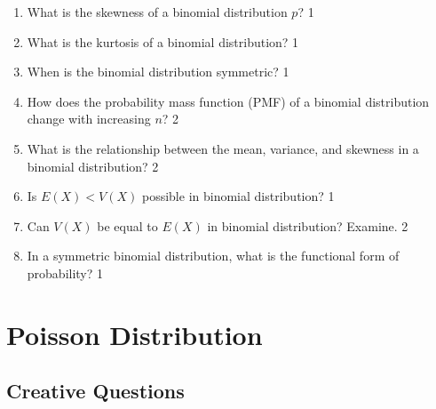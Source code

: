 \documentclass[a4paper,oneside, margin=1.4in]{book}
\begin{document}
\begin{enumerate}
\item What is the skewness of a binomial distribution \( p \)? \hfill 1

\item What is the kurtosis of a binomial distribution? \hfill 1

\item When is the binomial distribution symmetric? \hfill 1

\item How does the probability mass function (PMF) of a binomial distribution change with increasing \( n \)? \hfill 2

\item What is the relationship between the mean, variance, and skewness in a binomial distribution? \hfill 2

\item Is $E(X) < V(X)$ possible in binomial distribution? \hfill 1

\item Can $V(X)$ be equal to $E(X)$ in binomial distribution? Examine. \hfill 2

\item In a symmetric binomial distribution, what is the functional form of probability? \hfill 1


 \end{enumerate}

\chapter{Poisson Distribution} 
\section{Creative Questions}
\end{document}
